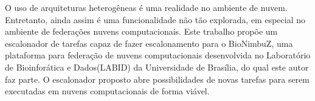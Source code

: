 
O uso de arquiteturas heterogêneas é uma realidade no ambiente de nuvem. Entretanto, ainda assim é uma funcionalidade não tão explorada, em especial no ambiente de federações nuvens computacionais. Este trabalho propõe um escalonador de tarefas capaz de fazer escalonamento para o BioNimbuZ, uma plataforma para federação de nuvens computacionais desenvolvida no Laboratório de Bioinforática e Dados(LABID) da Universidade de Brasília, do qual este autor faz parte. O escalonador proposto abre possibilidades de novas tarefas para serem executadas em nuvens computacionais de forma viável.

